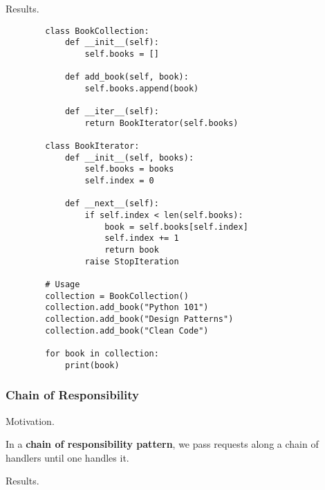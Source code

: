     Results. 

    \begin{example}
      \begin{lstlisting}
        class BookCollection:
            def __init__(self):
                self.books = []
            
            def add_book(self, book):
                self.books.append(book)
            
            def __iter__(self):
                return BookIterator(self.books)

        class BookIterator:
            def __init__(self, books):
                self.books = books
                self.index = 0
            
            def __next__(self):
                if self.index < len(self.books):
                    book = self.books[self.index]
                    self.index += 1
                    return book
                raise StopIteration

        # Usage
        collection = BookCollection()
        collection.add_book("Python 101")
        collection.add_book("Design Patterns")
        collection.add_book("Clean Code")
        
        for book in collection:
            print(book) 
      \end{lstlisting}
    \end{example}

  \subsubsection{Chain of Responsibility}

    Motivation. 

    \begin{definition}
      In a \textbf{chain of responsibility pattern}, we pass requests along a chain of handlers until one handles it. 
    \end{definition}

    Results. 

